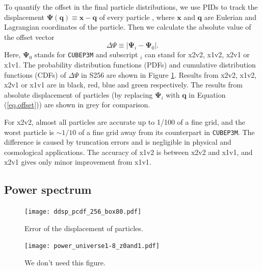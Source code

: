 \documentclass[10pt,twocolumn,preprint]{emulateapj}
\newcommand{\bs}{\boldsymbol}
\begin{document}
To quantify the offset in the final particle distributions, we use PIDs to track the displacement ${\bs \Psi}({\bs q})\equiv{\bs x}-{\bs q}$ of every particle \citep{2017PhRvD..95d3501Y}, where ${\bs x}$ and ${\bs q}$ are Eulerian and Lagrangian coordinates of the particle. Then we calculate the absolute value of the offset vector
\begin{equation}\label{eq.offset}
	\Delta\Psi\equiv|{\bs\Psi}_i-{\bs\Psi}_0|.
\end{equation}
Here, ${\bs\Psi}_0$ stands for {\tt CUBEP3M} and subscript $_i$ can stand for x2v2, x1v2, x2v1 or x1v1. The probability distribution functions (PDFs) and cumulative distribution functions (CDFs) of $\Delta\Psi$ in S256 are shown in Figure \ref{fig.dsp}. Results from x2v2, x1v2, x2v1 or x1v1 are in black, red, blue and green respectively. The results from absolute displacement of particles (by replacing ${\bs\Psi}_i$ with ${\bs q}$ in Equation (\ref{eq.offset})) are shown in grey for comparison.

For x2v2, almost all particles are accurate up to 1/100 of a fine grid, and the worst particle is $\sim 1/10$ of a fine grid away from its counterpart in {\tt CUBEP3M}. The difference is caused by truncation errors and is negligible in physical and cosmological applications. The accuracy of x1v2 is between x2v2 and x1v1, and x2v1 gives only minor improvement from x1v1. 

\subsection{Power spectrum}


\begin{figure}[t]
\centering
  \texttt{[image: ddsp\_pcdf\_256\_box80.pdf]}
 \caption{Error of the displacement of particles.}
\label{fig.dsp}
\end{figure}

\begin{figure}
\centering
  \texttt{[image: power\_universe1-8\_z0and1.pdf]}
 \caption{We don't need this figure.}
\label{fig.power}
\end{figure}
\end{document}
